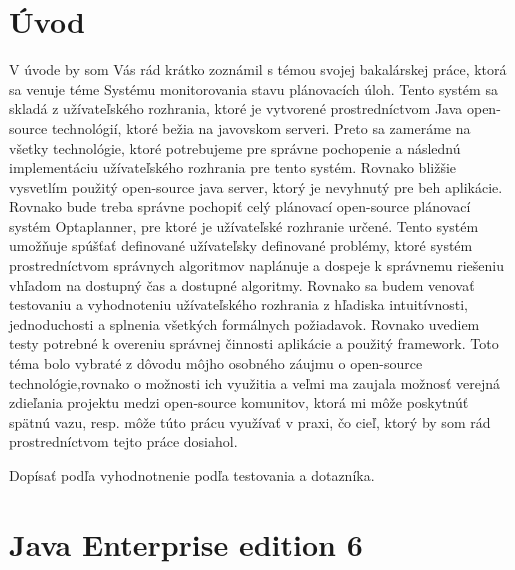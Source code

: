 

\chapter{Úvod}
V úvode by som Vás rád krátko zoznámil s témou svojej bakalárskej práce, ktorá sa venuje téme Systému monitorovania stavu plánovacích úloh. Tento systém sa skladá z užívateľského rozhrania, ktoré je vytvorené prostredníctvom Java open-source technológií, ktoré bežia na javovskom serveri. Preto sa zameráme na všetky technológie, ktoré potrebujeme pre správne pochopenie a následnú implementáciu užívateľského rozhrania pre tento systém. Rovnako bližšie vysvetlím použitý open-source java server, ktorý je nevyhnutý pre beh aplikácie. Rovnako bude treba správne pochopiť celý plánovací open-source plánovací systém Optaplanner, pre ktoré je užívateľské rozhranie určené. Tento systém umožňuje spúšťať definované užívateľsky definované problémy, ktoré systém prostredníctvom správnych algoritmov naplánuje a dospeje k správnemu riešeniu vhľadom na dostupný čas a dostupné algoritmy. Rovnako sa budem venovať testovaniu a vyhodnoteniu užívateľského rozhrania z hľadiska intuitívnosti, jednoduchosti a splnenia všetkých formálnych požiadavok. Rovnako uvediem testy potrebné k overeniu správnej činnosti aplikácie a použitý framework. Toto téma bolo vybraté z dôvodu môjho osobného záujmu o open-source technológie,rovnako o možnosti ich využitia a veľmi ma zaujala možnosť verejná zdieľania projektu medzi open-source komunitov, ktorá mi môže poskytnúť spätnú vazu, resp. môže túto prácu využívať v praxi, čo cieľ, ktorý by som rád prostredníctvom tejto práce dosiahol.

Dopísať podľa vyhodnotnenie podľa testovania a dotazníka.




\chapter{Java Enterprise edition 6}
